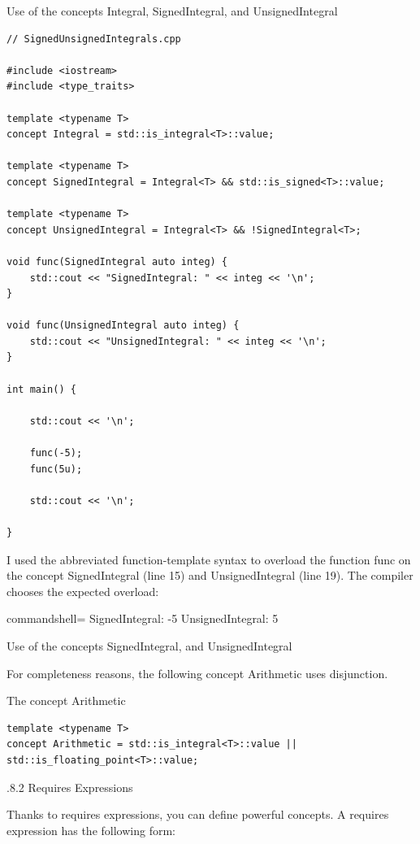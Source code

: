 \noindent
Use of the concepts Integral, SignedIntegral, and UnsignedIntegral
\begin{lstlisting}[style=styleCXX]
// SignedUnsignedIntegrals.cpp

#include <iostream>
#include <type_traits>

template <typename T>
concept Integral = std::is_integral<T>::value;

template <typename T>
concept SignedIntegral = Integral<T> && std::is_signed<T>::value;

template <typename T>
concept UnsignedIntegral = Integral<T> && !SignedIntegral<T>;

void func(SignedIntegral auto integ) {
	std::cout << "SignedIntegral: " << integ << '\n';
}

void func(UnsignedIntegral auto integ) {
	std::cout << "UnsignedIntegral: " << integ << '\n';
}

int main() {
	
	std::cout << '\n';
	
	func(-5);
	func(5u);
	
	std::cout << '\n';

}
\end{lstlisting}

I used the abbreviated function-template syntax to overload the function func on the concept SignedIntegral (line 15) and UnsignedIntegral (line 19). The compiler chooses the expected overload:

\begin{tcblisting}{commandshell={}}
SignedIntegral: -5
UnsignedIntegral: 5
\end{tcblisting}

\begin{center}
Use of the concepts SignedIntegral, and UnsignedIntegral
\end{center}

For completeness reasons, the following concept Arithmetic uses disjunction.

\noindent
The concept Arithmetic
\begin{lstlisting}[style=styleCXX]
template <typename T>
concept Arithmetic = std::is_integral<T>::value || std::is_floating_point<T>::value;
\end{lstlisting}

.8.2\hspace{0.2cm} Requires Expressions

Thanks to requires expressions, you can define powerful concepts. A requires expression has the following form:

